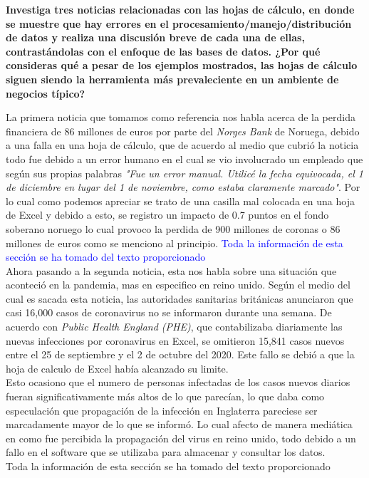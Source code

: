 \begin{center}
\textbf{Investiga tres noticias relacionadas con las hojas de cálculo, en donde se muestre que hay errores en el procesamiento/manejo/distribución de datos y realiza una discusión breve de cada una de ellas, contrastándolas con el enfoque de las bases de datos. ¿Por qué consideras qué a pesar de los ejemplos mostrados, las hojas de cálculo siguen siendo la herramienta más prevaleciente en un ambiente de negocios típico?} \\
\end{center}

La primera noticia que tomamos como referencia nos habla acerca de la perdida financiera de 86 millones de euros por parte del \textit{Norges Bank} de Noruega, debido a una falla en una hoja de cálculo, que de acuerdo al medio que cubrió la noticia todo fue debido a un error humano en el cual se vio involucrado un empleado que según sus propias palabras \textit{"Fue un error manual. Utilicé la fecha equivocada, el 1 de diciembre en lugar del 1 de noviembre, como estaba claramente marcado"}. Por lo cual como podemos apreciar se trato de una casilla mal colocada en una hoja de Excel y debido a esto, se registro un impacto de 0.7 puntos en el fondo soberano noruego lo cual provoco la perdida de 900 millones de coronas o 86 millones de euros como se menciono al principio. 
\textcolor{blue}{Toda la información de esta sección se ha tomado del texto proporcionado\cite{dinero_en_imagen_2024}}
\\

Ahora pasando a la segunda noticia, esta nos habla sobre una situación que aconteció en la pandemia, mas en especifico en reino unido. Según el medio del cual es sacada esta noticia, las autoridades sanitarias británicas anunciaron que casi 16,000 casos de coronavirus no se informaron durante una semana. De acuerdo con \textit{Public Health England (PHE)}, que contabilizaba diariamente las nuevas infecciones por coronavirus en Excel, se omitieron 15,841 casos nuevos entre el 25 de septiembre y el 2 de octubre del 2020. Este fallo se debió a que la hoja de calculo de Excel había alcanzado su limite. \\

Esto ocasiono que el numero de personas infectadas de los casos nuevos diarios fueran significativamente más altos de lo que parecían, lo que daba como especulación que propagación de la infección en Inglaterra pareciese ser marcadamente mayor de lo que se informó. Lo cual afecto de manera mediática en como fue percibida la propagación del virus en reino unido, todo debido a un fallo en el software que se utilizaba para almacenar y consultar los datos.\textcolor{blue} \\
{Toda la información de esta sección se ha tomado del texto proporcionado\cite{deyden-2020}}
\\

